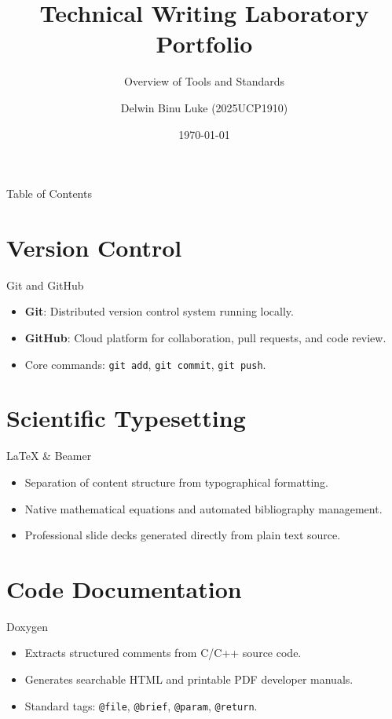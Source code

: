 \documentclass{beamer}
\title{Technical Writing Laboratory Portfolio}
\subtitle{Overview of Tools and Standards}
\author{Delwin Binu Luke (2025UCP1910)}
\institute{MNIT Jaipur}
\date{\today}
\begin{document}
\begin{frame}
  \titlepage
\end{frame}

\begin{frame}{Table of Contents}
  \tableofcontents
\end{frame}

\section{Version Control}
\begin{frame}{Git and GitHub}
  \begin{itemize}
    \item \textbf{Git}: Distributed version control system running locally.
    \item \textbf{GitHub}: Cloud platform for collaboration, pull requests, and code review.
    \item Core commands: \texttt{git add}, \texttt{git commit}, \texttt{git push}.
  \end{itemize}
\end{frame}

\section{Scientific Typesetting}
\begin{frame}{LaTeX \& Beamer}
  \begin{itemize}
    \item Separation of content structure from typographical formatting.
    \item Native mathematical equations and automated bibliography management.
    \item Professional slide decks generated directly from plain text source.
  \end{itemize}
\end{frame}

\section{Code Documentation}
\begin{frame}{Doxygen}
  \begin{itemize}
    \item Extracts structured comments from C/C++ source code.
    \item Generates searchable HTML and printable PDF developer manuals.
    \item Standard tags: \texttt{@file}, \texttt{@brief}, \texttt{@param}, \texttt{@return}.
  \end{itemize}
\end{frame}
\end{document}

